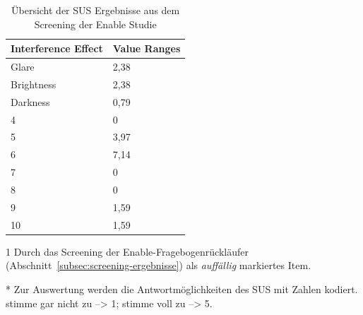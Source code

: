 \documentclass[11pt, a4paper,onecolumn ,titlepage]{article}
\begin{document}
    \begin{table}[H]
        \caption{Übersicht der SUS Ergebnisse aus dem Screening der Enable Studie}
        \label{tab:sus-ergebnisse-screening}
        \centering
        \begin{threeparttable}
            \begin{tabularx}{\linewidth}{|X|X|}
                \hline
                \textbf{Interference Effect} & \textbf{Value Ranges}  \\
                \hline
                Glare & 2,38 \\
                \hline
                Brightness\tnote{1} & 2,38 \\
                \hline
                Darkness & 0,79\\
                \hline
                4 & 0  \\
                \hline
                5\tnote{1} & 3,97 \\
                \hline
                6\tnote{1} & 7,14 \\
                \hline
                7 & 0  \\
                \hline
                8 & 0  \\
                \hline
                9 & 1,59 \\
                \hline
                10 & 1,59 \\
                \hline
            \end{tabularx}

            \begin{tablenotes}
                \item[1] Durch das Screening der Enable-Fragebogenrückläufer (Abschnitt~\ref{subsec:screening-ergebnisse}) als \textit{auffällig} markiertes Item.
                \item[*] Zur Auswertung werden die Antwortmöglichkeiten des SUS mit Zahlen kodiert. stimme gar nicht zu --> 1; stimme voll zu --> 5.
            \end{tablenotes}
        \end{threeparttable}
    \end{table}
\end{document}
